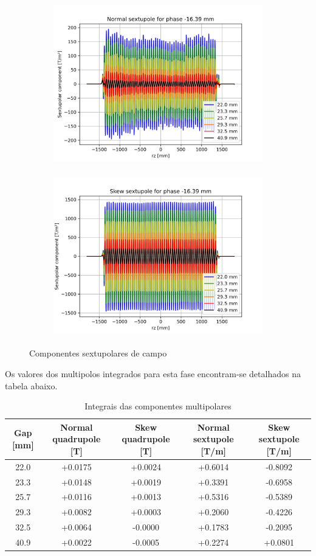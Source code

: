 \documentclass[a4paper,12pt]{article}
\begin{document}
\begin{figure}[H]
\begin{subfigure}{0.5\textwidth}
\includegraphics[width=0.9\linewidth, height=7cm]{figs/phase-16 Normal sextupole.png} 
\label{fig:subim1-16s}
\end{subfigure}
\begin{subfigure}{0.5\textwidth}
\includegraphics[width=0.9\linewidth, height=7cm]{figs/phase-16 Skew sextupole.png}
\label{fig:subim2-16s}
\end{subfigure}
\caption{Componentes sextupolares de campo}
\label{fig:sext-16}
\end{figure}

Os valores dos multipolos integrados para esta fase encontram-se detalhados na tabela abaixo.

\begin{table}[H]\footnotesize
\caption{Integrais das componentes multipolares}
\centering
\begin{tabular}{|c|c|c|c|c|}
\hline
   Gap [mm] &   Normal quadrupole [T] &   Skew quadrupole [T] &   Normal sextupole [T/m] &   Skew sextupole [T/m] \\
\hline
22.0 & +0.0175 & +0.0024 & +0.6014 & -0.8092 \\
23.3 & +0.0148 & +0.0019 & +0.3391 & -0.6958 \\
25.7 & +0.0116 & +0.0013 & +0.5316 & -0.5389 \\
29.3 & +0.0082 & +0.0003 & +0.2060 & -0.4226 \\
32.5 & +0.0064 & -0.0000 & +0.1783 & -0.2095 \\
40.9 & +0.0022 & -0.0005 & +0.2274 & +0.0801 \\
\hline
\end{tabular}
\end{table}
\end{document}
